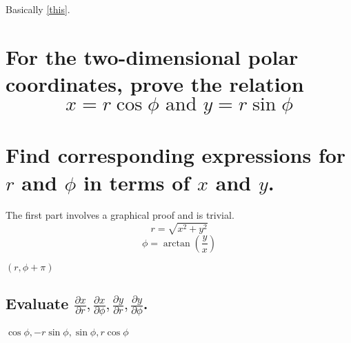 \documentclass[answers]{exam}
\begin{document}
\begin{questions}
\begin{solution}
	Basically \ref{this}.
\end{solution}

\question{}
\begin{parts}
	\part{For the two-dimensional polar coordinates, prove the relation
		$$x = r\cos\phi \text{ and } y = r\sin\phi$$
	}
	\part{Find corresponding expressions for $r$ and $\phi$ in terms of $x$ and $y$.}
\end{parts}

\begin{solution}
	The first part involves a graphical proof and is trivial.
	$$r = \sqrt{x^2 + y^2}$$
	$$\phi = \arctan\left(\frac{y}{x}\right)$$
\end{solution}


\begin{solution}
	$(r, \phi+\pi)$
\end{solution}


\begin{parts}
	\part{Evaluate $\frac{\partial x}{\partial r}, \frac{\partial x}{\partial \phi}, \frac{\partial y}{\partial r}, \frac{\partial y}{\partial \phi}$.}
	
	\begin{solution}
		$\cos\phi, -r\sin\phi, \sin\phi, r\cos\phi$
	\end{solution}


\end{parts}
\end{questions}
\end{document}
